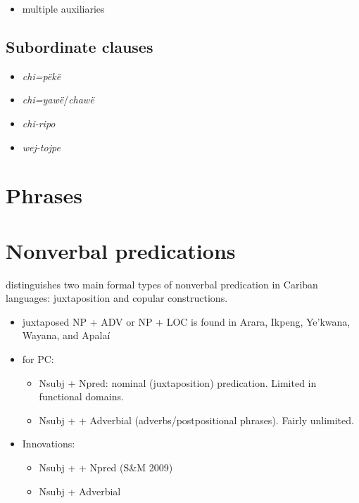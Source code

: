 \documentclass{memoir}
\begin{document}
\begin{itemize}
\tightlist
\item
  multiple auxiliaries
\end{itemize}

\section{Subordinate clauses}

\begin{itemize}
\tightlist
\item
  \emph{chi=pëkë}
\item
  \emph{chi=yawë}/\emph{chawë}
\item
  \emph{chi-ripo}
\item
  \emph{wej-tojpe}
\end{itemize}

\chapter{\texorpdfstring{Phrases \label{phrases}}{Phrases }}

\chapter{\texorpdfstring{Nonverbal predications
\label{nonverbal}}{Nonverbal predications }}

\textcites[366]{gildea2018reconstructing} distinguishes two main formal
types of nonverbal predication in Cariban languages: juxtaposition and
copular constructions.

\begin{itemize}
\tightlist
\item
  juxtaposed NP + ADV or NP + LOC is found in Arara, Ikpeng, Ye'kwana,
  Wayana, and Apalaí
\item
  for PC:

  \begin{itemize}
  \tightlist
  \item
    Nsubj + Npred: nominal (juxtaposition) predication. Limited in
    functional domains.
  \item
    Nsubj +  + Adverbial (adverbs/postpositional phrases).
    Fairly unlimited.
  \end{itemize}
\item
  Innovations:

  \begin{itemize}
  \tightlist
  \item
    Nsubj +  + Npred (S\&M 2009)
  \item
    Nsubj + Adverbial
  \end{itemize}
\end{itemize}
\end{document}
